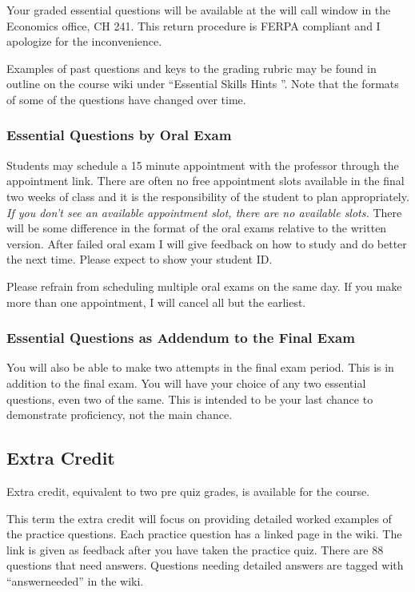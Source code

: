 \documentclass[letterpaper,10pt]{article}
\newif\ifonline
\begin{document}
  Your graded essential questions will be available at the will call window in the Economics office, CH 241.  This return procedure is FERPA compliant and I apologize for the inconvenience.
  
  Examples of past questions and keys to the grading rubric may be found
  in outline on the course wiki under ``Essential Skills Hints ''.  Note that the formats of some of the questions have changed over time.
  
  \subsubsection{Essential Questions by Oral Exam}
  
  Students may schedule a 15 minute appointment with the professor through the appointment link. There are often no free appointment slots available in the final two weeks of class and it is the responsibility of the student to plan appropriately. \emph{If you don’t see an available appointment slot, there are no available slots.} There will be some difference in the format of the oral exams relative to the written version. After failed oral exam I will give feedback on how to study and do better the next time. Please expect to show your student ID.
  
  Please refrain from scheduling multiple oral exams on the same day.  If you make more than one appointment, I will cancel all but the earliest.
  
  \subsubsection{ Essential Questions as Addendum to the Final Exam}
  You will also be able to make two attempts in the final exam period. This is in addition to the final exam. You will have your choice of any two essential questions, even two of the same. This is intended to be your last chance to demonstrate proficiency, not the main chance.

\fi

\ifonline

\else
\subsection{Extra Credit}\label{sec:ExtraCredit}
Extra credit, equivalent to two pre quiz grades, is available for the
course.  

This term the extra credit will focus on providing detailed worked examples of the practice questions.  Each practice question has a linked page in the wiki.  The link is given as feedback after you have taken the practice quiz.  There are 88 questions that need answers.  Questions needing detailed answers are tagged with ``answerneeded'' in the wiki.
\end{document}

